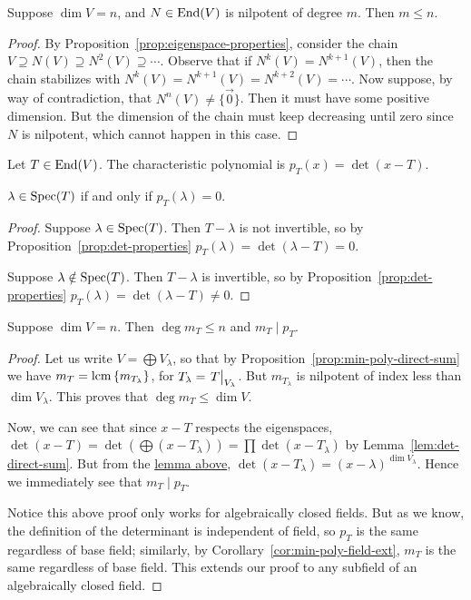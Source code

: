 \begin{lemma}\label{lem:nilpotent-degree}
    Suppose \(\dim V = n\), and \(N \in \operatorname{End}(V)\) is nilpotent of degree \(m\).
    Then \(m \leq n\).
\end{lemma}
\begin{proof}
    By Proposition~\ref{prop:eigenspace-properties},
    consider the chain \(V \supseteq N(V) \supseteq N^2(V) \supseteq \cdots\).
    Observe that if \(N^k(V) = N^{k+1}(V)\),
    then the chain stabilizes with \(N^k(V) = N^{k+1}(V) = N^{k+2}(V) = \cdots\).
    Now suppose, by way of contradiction, that \(N^n(V) \neq \{\vec{0}\}\).
    Then it must have some positive dimension.
    But the dimension of the chain must keep decreasing until zero since \(N\) is nilpotent,
    which cannot happen in this case.
\end{proof}
\begin{definition}
    Let \(T \in \operatorname{End}(V)\).
    The characteristic polynomial is \(p_T(x) = \det(x-T)\).
\end{definition}
\begin{lemma}\label{lem:char-poly-roots}
    \(\lambda \in \operatorname{Spec}(T)\) if and only if \(p_T(\lambda) = 0\).
\end{lemma}
\begin{proof}
    Suppose \(\lambda \in \operatorname{Spec}(T)\).
    Then \(T-\lambda\) is not invertible,
    so by Proposition~\ref{prop:det-properties} \(p_T(\lambda) = \det(\lambda-T) = 0\).

    Suppose \(\lambda \notin \operatorname{Spec}(T)\).
    Then \(T-\lambda\) is invertible,
    so by Proposition~\ref{prop:det-properties} \(p_T(\lambda) = \det(\lambda-T) \neq 0\).
\end{proof}
\begin{theorem}\label{thm:cayley-hamilton}
    Suppose \(\dim V = n\).
    Then \(\deg m_T \leq n\) and \(m_T \mid p_T\).
\end{theorem}
\begin{proof}
    Let us write \(V = \bigoplus V_\lambda\),
    so that by Proposition~\ref{prop:min-poly-direct-sum} we have
    \(m_T = \operatorname{lcm}{\{m_{T_\lambda}\}}\), for \(T_\lambda = \eval{T}_{V_\lambda}\).
    But \(m_{T_\lambda}\) is nilpotent of index less than \(\dim V_\lambda\).
    This proves that \(\deg m_T \leq \dim V\).

    Now, we can see that since \(x-T\) respects the eigenspaces,
    \(\det(x-T) = \det(\bigoplus (x-T_\lambda)) = \prod \det(x-T_\lambda)\)
    by Lemma~\ref{lem:det-direct-sum}.
    But from the \hyperref[lem:char-poly-roots]{lemma above},
    \(\det(x-T_\lambda) = {(x-\lambda)}^{\dim V_\lambda}\).
    Hence we immediately see that \(m_T \mid p_T\).

    Notice this above proof only works for algebraically closed fields.
    But as we know, the definition of the determinant is independent of field,
    so \(p_T\) is the same regardless of base field;
    similarly, by Corollary~\ref{cor:min-poly-field-ext},
    \(m_T\) is the same regardless of base field.
    This extends our proof to any subfield of an algebraically closed field.
\end{proof}


